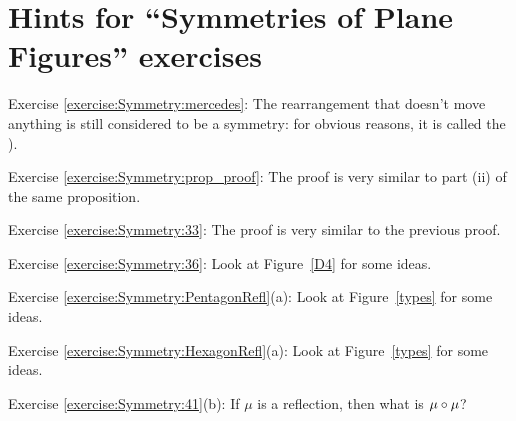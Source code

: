 \section{Hints for ``Symmetries of Plane Figures'' exercises}\label{sec:Symmetry:Hints}

\noindent Exercise \ref{exercise:Symmetry:mercedes}: The rearrangement that doesn't move anything is still considered to be a symmetry: for obvious reasons, it is called the ).

\noindent Exercise \ref{exercise:Symmetry:prop_proof}: The proof is very similar to part (ii) of the same proposition.

\noindent Exercise \ref{exercise:Symmetry:33}: The proof is very similar to the previous proof.

\noindent Exercise \ref{exercise:Symmetry:36}: Look at Figure~\ref{D4} for some ideas.

\noindent Exercise \ref{exercise:Symmetry:PentagonRefl}(a): Look at Figure~\ref{types} for some ideas.

\noindent Exercise \ref{exercise:Symmetry:HexagonRefl}(a): Look at Figure~\ref{types} for some ideas.

\noindent Exercise \ref{exercise:Symmetry:41}(b): If $\mu$ is a reflection, then what is $\mu \circ \mu$?
